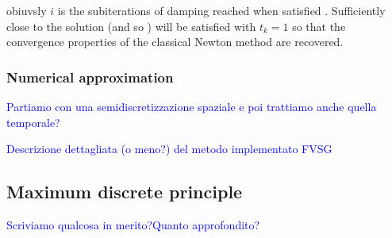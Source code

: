 obiuvsly $i$ is the subiterations of damping reached when satisfied . Sufficiently close to the solution  (and so ) will be satisfied with $t_k=1$ so that the convergence properties of the classical Newton method are recovered.
 




\subsubsection{Numerical approximation}

  
\textcolor{blue}{Partiamo con una semidiscretizzazione spaziale e poi trattiamo anche quella temporale?}

\textcolor{blue}{Descrizione dettagliata (o meno?) del metodo implementato FVSG}

\subsection{Maximum discrete principle}
\textcolor{blue}{Scriviamo qualcosa in merito?Quanto approfondito?}




